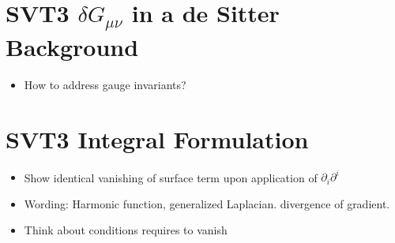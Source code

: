 \documentclass[10pt,letterpaper]{article}
\numberwithin{equation}{section}
\begin{document}
\section*{SVT3 $\delta G_{\mu\nu}$ in a de Sitter Background}
\begin{itemize}
	\item How to address gauge invariants?
\end{itemize}

\section*{SVT3 Integral Formulation}
\begin{itemize}
	\item Show identical vanishing of surface term upon application of $\partial_i \partial^i$
	\item Wording: Harmonic function, generalized  Laplacian. divergence of gradient. 
	\item Think about conditions requires to vanish
\end{itemize}
\end{document}

